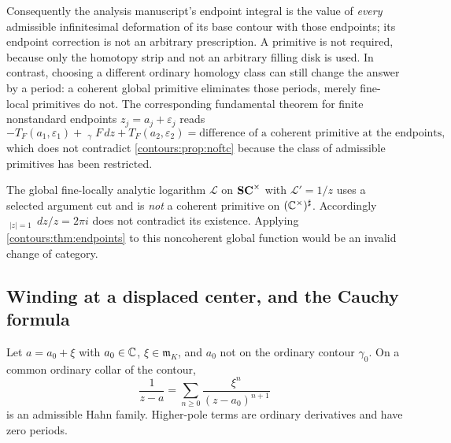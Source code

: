 \documentclass[11pt,letterpaper]{article}
\theoremstyle{definition}
\theoremstyle{remark}
\newcommand{\m}{\mathfrak m}\newcommand{\st}{\operatorname{st}}
\newcommand{\HInt}{\mathop{\int^{\!H}}\nolimits}
\newcommand{\HCoint}{\mathop{\oint^{\!H}}\nolimits}
\newcommand{\sh}{^{\sharp}}\newcommand{\dd}{\,d}
\numberwithin{equation}{section}
\begin{document}
Consequently the analysis manuscript's endpoint integral is the value of
\emph{every} admissible infinitesimal deformation of its base contour with those
endpoints; its endpoint correction is not an arbitrary prescription. A primitive is
not required, because only the homotopy strip and not an arbitrary filling disk is
used. In contrast, choosing a different ordinary homology class can still change
the answer by a period: a coherent global primitive eliminates those periods,
merely fine-local primitives do not. The corresponding fundamental theorem for
finite nonstandard endpoints $z_j=a_j+\varepsilon_j$ reads
\begin{equation}\label{contours:eq:endpointFTC}
  -T_F(a_1,\varepsilon_1)+\HInt_\gamma F\dd z+T_F(a_2,\varepsilon_2)
  =\text{difference of a coherent primitive at the endpoints},
\end{equation}
which does not contradict \cref{contours:prop:noftc} because the class of
admissible primitives has been restricted.

\begin{example}
\label{contours:ex:logarithm}
The global fine-locally analytic logarithm $\mathcal L$ on $\mathbf{SC}^\times$ with
$\mathcal L'=1/z$ uses a selected argument cut and is \emph{not} a coherent
primitive on $(\C^\times)\sh$. Accordingly $\HCoint_{|z|=1}\dd z/z=2\pi i$ does not
contradict its existence. Applying \cref{contours:thm:endpoints} to this
noncoherent global function would be an invalid change of category.
\end{example}

\subsection{Winding at a displaced center, and the Cauchy formula}
Let $a=a_0+\xi$ with $a_0\in\mathbb C$, $\xi\in\m_K$, and $a_0$ not on the ordinary
contour $\gamma_0$. On a common ordinary collar of the contour,
\[
  \frac1{z-a}=\sum_{n\ge0}\frac{\xi^n}{(z-a_0)^{n+1}}
\]
is an admissible Hahn family. Higher-pole terms are ordinary derivatives and have
zero periods.
\end{document}
